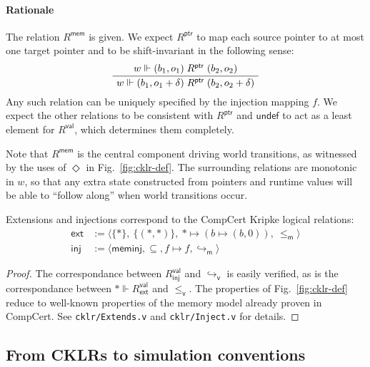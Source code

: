 \documentclass[acmsmall,screen,review,anonymous]{acmart}
\newcommand{\kw}[1]{\ensuremath{ \mathsf{#1} }}
\newcommand{\vref}{\le_\kw{v}}
\newcommand{\mext}{\le_\kw{m}}
\begin{document}
\paragraph{Rationale} %

The relation $R^\kw{mem}$ is given.
We expect $R^\kw{ptr}$ to map
each source pointer to at most one target pointer
and to be shift-invariant in the following sense:
\[
  \AxiomC{$w \Vdash (b_1, o_1) \mathrel{R^\kw{ptr}} (b_2, o_2)$}
  \UnaryInfC{$w \Vdash (b_1, o_1 + \delta) \mathrel{R^\kw{ptr}} (b_2, o_2 + \delta)$}
  \DisplayProof
\]
Any such relation can be uniquely specified by
the injection mapping $f$.
We expect the other relations to be consistent with $R^\kw{ptr}$
and $\kw{undef}$ to act as a least element for $R^\kw{val}$,
which determines them completely.


Note that $R^\kw{mem}$
is the central component driving world transitions,
as witnessed by the uses of $\Diamond$ in Fig.~\ref{fig:cklr-def}.
The surrounding relations are monotonic in $w$,
so that any extra state
constructed from pointers and runtime values
will be able to ``follow along'' when
world transitions occur.

\begin{theorem}
Extensions and injections
correspond to the CompCert Kripke logical relations:
\begin{align*}
  \kw{ext} &:=
    \langle \{*\}, \: \{(*,*)\}, \: * \mapsto (b \mapsto (b, 0)), \:
    {\mext} \rangle
  \\
  \kw{inj} &:=
    \langle \kw{meminj}, {\subseteq}, f \mapsto f,
      {\hookrightarrow_\kw{m}} \rangle
\end{align*}
\begin{proof}
The correspondance between $R^\kw{val}_\kw{inj}$ and
$\hookrightarrow_\kw{v}$ is easily verified,
as is the correspondance between
$* \Vdash R^\kw{val}_\kw{ext}$ and $\vref$.
The properties of Fig.~\ref{fig:cklr-def}
reduce to well-known properties of the memory model
already proven in CompCert.
See \texttt{cklr/Extends.v} and \texttt{cklr/Inject.v}
for details.
\end{proof}
\end{theorem}


\subsection{From CKLRs to simulation conventions} \label{sec:cklrsc} %
\end{document}
